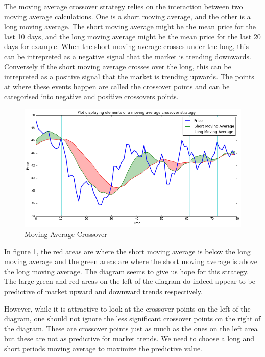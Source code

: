 \documentclass{report}
\begin{document}
The moving average crossover strategy relies on the interaction between two moving average calculations. One is a short moving average, and the other is a long moving average. The short moving average might be the mean price for the last 10 days, and the long moving average might be the mean price for the last 20 days for example. When the short moving average crosses under the long, this can be intrepreted as a negative signal that the market is trending downwards. Conversely if the short moving average crosses over the long, this can be intrepreted as a positive signal that the market is trending upwards. The points at where these events happen are called the crossover points and can be categorised into negative and positive crossovers points.

\begin{figure}[H]
	\caption{Moving Average Crossover}
	\centerline{\includegraphics[width=\textwidth]{vis/macrossover.png}}
	\label{fig:macrossover}
\end{figure}

In figure \ref{fig:macrossover}, the red areas are where the short moving average is below the long moving average and the green areas are where the short moving average is above the long moving average. The diagram seems to give us hope for this strategy. The large green and red areas on the left of the diagram do indeed appear to be predictive of market upward and downward trends respectively. 

However, while it is attractive to look at the crossover points on the left of the diagram, one should not ignore the less significant crossover points on the right of the diagram. These are crossover points just as much as the ones on the left area but these are not as predictive for market trends. We need to choose a long and short periods moving average to maximize the predictive value.
\end{document}
